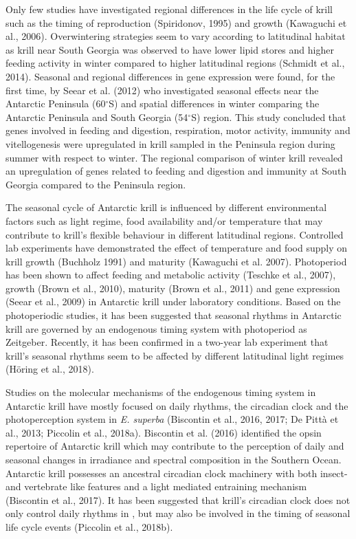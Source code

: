 Only few studies have investigated regional differences in the life cycle of
krill such as the timing of reproduction (Spiridonov, 1995) and growth
(Kawaguchi et al., 2006). Overwintering strategies seem to vary according to
latitudinal habitat as krill near South Georgia was observed to have lower
lipid stores and higher feeding activity in winter compared to higher
latitudinal regions (Schmidt et al., 2014). Seasonal and regional differences
in gene expression were found, for the first time, by Seear et al. (2012) who
investigated seasonal effects near the Antarctic Peninsula (60$^{\circ}$S) and
spatial differences in winter comparing the Antarctic Peninsula and South
Georgia (54$^{\circ}$S) region. This study concluded that genes involved in
feeding and digestion, respiration, motor activity, immunity and vitellogenesis
were upregulated in krill sampled in the Peninsula region during summer with
respect to winter. The regional comparison of winter krill revealed an
upregulation of genes related to feeding and digestion and immunity at South
Georgia compared to the Peninsula region.

The seasonal cycle of Antarctic krill is influenced by different environmental
factors such as light regime, food availability and/or temperature that may
contribute to krill's flexible behaviour in different latitudinal regions.
Controlled lab experiments have demonstrated the effect of temperature and food
supply on krill growth (Buchholz 1991) and maturity (Kawaguchi et al. 2007).
Photoperiod has been shown to affect feeding and metabolic activity (Teschke et
al., 2007), growth (Brown et al., 2010), maturity (Brown et al., 2011) and gene
expression (Seear et al., 2009) in Antarctic krill under laboratory conditions.
Based on the photoperiodic studies, it has been suggested that seasonal rhythms
in Antarctic krill are governed by an endogenous timing system with photoperiod
as Zeitgeber. Recently, it has been confirmed in a two-year lab experiment that
krill's seasonal rhythms seem to be affected by different latitudinal light
regimes (Höring et al., 2018).

Studies on the molecular mechanisms of the endogenous timing system in
Antarctic krill have mostly focused on daily rhythms, the circadian clock and
the photoperception system in \textit{E. superba}  (Biscontin et al., 2016,
2017; De Pittà et al., 2013; Piccolin et al., 2018a). Biscontin et al. (2016)
identified the opsin repertoire of Antarctic krill which may contribute to the
perception of daily and seasonal changes in irradiance and spectral composition
in the Southern Ocean. Antarctic krill possesses an ancestral circadian clock
machinery with both insect- and vertebrate like features and a light mediated
entraining mechanism (Biscontin et al., 2017). It has been suggested that
krill's circadian clock does not only control daily rhythms in , but may also be involved in the timing of seasonal life cycle events
(Piccolin et al., 2018b).

